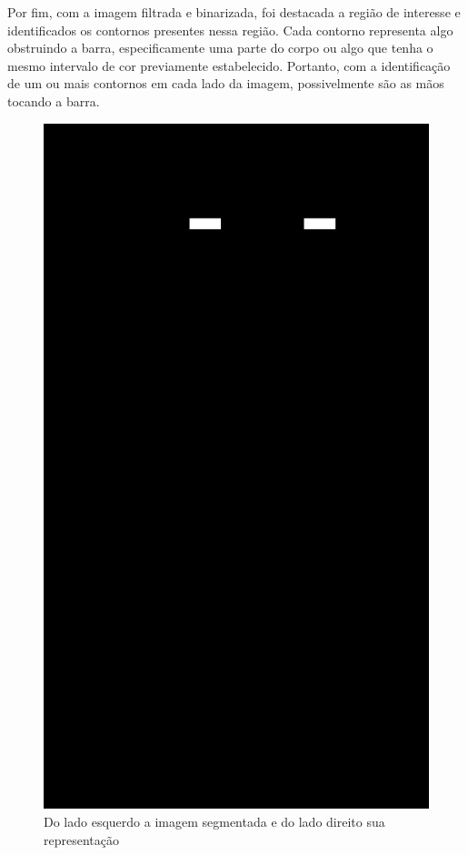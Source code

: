 Por fim, com a imagem filtrada e binarizada, foi destacada a região de interesse e identificados os contornos presentes nessa região. Cada contorno representa algo obstruindo a barra, especificamente uma parte do corpo ou algo que tenha o mesmo intervalo de cor previamente estabelecido. Portanto, com a identificação de um ou mais contornos em cada lado da imagem, possivelmente são as mãos tocando a barra.

\begin{figure}[H]
    \centering
    \caption{Do lado esquerdo a imagem segmentada e do lado direito sua representação}
        \begin{minipage}{\sizeImg\textwidth}
            \includegraphics[width=\textwidth]{figuras/mao_barra/only_hands.png}

\end{minipage}
\end{figure}
